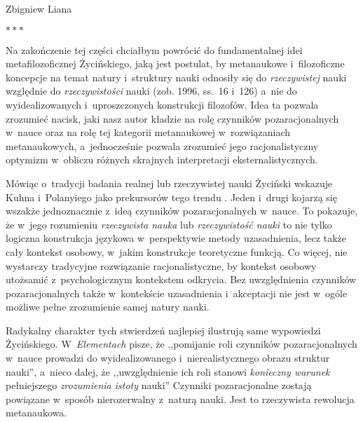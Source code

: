 \begin{artplenv}{Zbigniew Liana}
\pagebreak%
\medskip
{\centering$\ast\ast\ast$\par}
\smallskip


Na zakończenie tej części chciałbym powrócić do fundamentalnej idei metafilozoficznej Życińskiego, jaką jest postulat,
by metanaukowe i~filozoficzne koncepcje na temat natury i~struktury nauki odnosiły się do \textit{rzeczywistej} nauki
względnie do \textit{rzeczywistości} nauki (zob. 1996, ss.~16 i~126) a~nie do wyidealizowanych i~uproszczonych
konstrukcji filozofów. Idea ta pozwala zrozumieć nacisk, jaki nasz autor kładzie na rolę czynników pozaracjonalnych w~nauce
oraz na rolę tej kategorii metanaukowej w~rozwiązaniach metanaukowych, a~jednocześnie pozwala zrozumieć jego
racjonalistyczny optymizm w~obliczu różnych skrajnych interpretacji eksternalistycznych.

Mówiąc o~tradycji badania realnej lub rzeczywistej nauki Życiński wskazuje Kuhna i~Polanyiego jako prekursorów tego
trendu
\parencites[s.~153.169]{zycinski_jezyk_1983}[s.~231]{zycinski_elementy_1996}.
Jeden i~drugi kojarzą się wszakże
jednoznacznie z~ideą czynników pozaracjonalnych w~nauce. To pokazuje, że w~jego rozumieniu \textit{rzeczywista nauka} lub
\textit{rzeczywistość nauki} to nie tylko logiczna konstrukcja językowa w~perspektywie metody uzasadnienia, lecz także
cały kontekst osobowy, w~jakim konstrukcje teoretyczne funkcją. Co więcej, nie wystarczy tradycyjne rozwiązanie
racjonalistyczne, by kontekst osobowy utożsamić z~psychologicznym kontekstem odkrycia. Bez uwzględnienia czynników
pozaracjonalnych także w~kontekście uzasadnienia i~akceptacji nie jest w~ogóle możliwe pełne zrozumienie samej natury
nauki.

Radykalny charakter tych stwierdzeń najlepiej ilustrują same wypowiedzi Życińskiego. W~\textit{Elementach} pisze, że
,,pomijanie roli czynników pozaracjonalnych w~nauce prowadzi do wyidealizowanego i~nierealistycznego obrazu struktur
nauki'',
a~nieco dalej, że ,,uwzględnienie ich roli stanowi
\textit{konieczny warunek} pełniejszego \textit{zrozumienia istoty} nauki''
\parencite[s.~189.190, podkreślenia moje]{zycinski_elementy_1996}
 Czynniki pozaracjonalne zostają powiązane w~sposób nierozerwalny z~naturą nauki. Jest to
rzeczywista rewolucja metanaukowa.


\end{artplenv}
